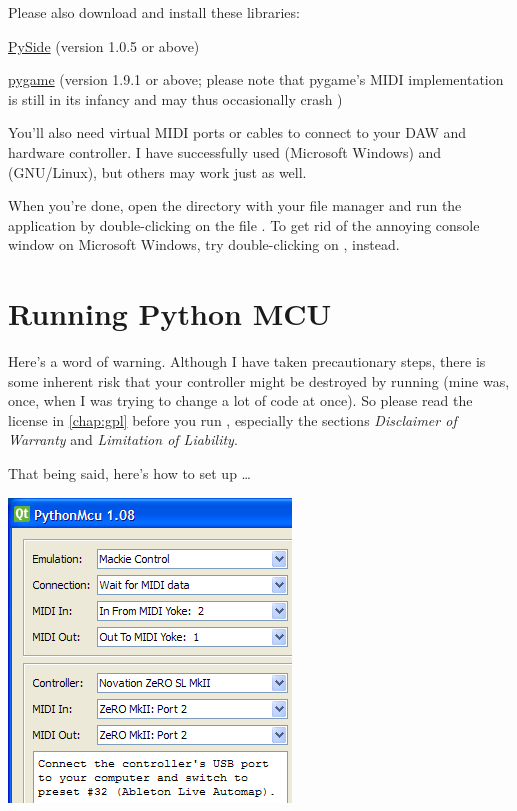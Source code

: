 Please also download and install these libraries:

\begin{compactitem}
\item \href{http://www.pyside.org//}{PySide} (version 1.0.5 or above)
\item \href{http://www.pygame.org/}{pygame} (version 1.9.1 or above;
  please note that pygame's MIDI implementation is still in its
  infancy and may thus occasionally crash )
\end{compactitem}

You'll also need virtual MIDI ports or cables to connect
 to your DAW and hardware controller.  I have
successfully used  (Microsoft Windows) and
 (GNU/Linux), but others may work just as well.

When you're done, open the directory  with your file manager
and run the application by double-clicking on the file
.  To get rid of the annoying console window on
Microsoft Windows, try double-clicking on ,
instead.

\chapter{Running Python MCU}
\label{chap:runnint_python_mcu}

Here's a word of warning.  Although I have taken precautionary steps,
there is some inherent risk that your controller might be destroyed by
running  (mine was, once, when I was trying to
change a lot of code at once).  So please read the license in
\ref{chap:gpl} before you run , especially the
sections \emph{Disclaimer of Warranty} and \emph{Limitation of
  Liability}.

That being said, here's how to set up \dots

\begin{center}
  \includegraphics[scale=\screenshotscale,clip]{include/images/python_mcu.png}
\end{center}


